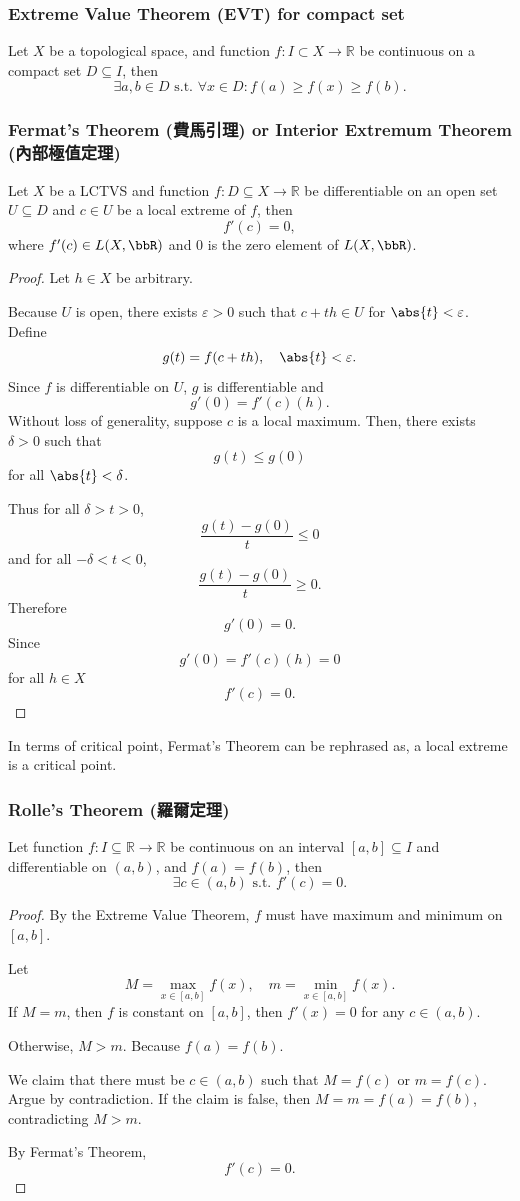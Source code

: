 \subsubsection{Extreme Value Theorem (EVT) for compact set}
Let $X$ be a topological space, and function $f\colon I\subset X\to\mathbb{R}$ be continuous on a compact set $D\subseteq I$, then
\[\exists a,b \in D \text{\ s.t.\ }\forall x \in D\colon f(a)\geq f(x)\geq f(b).\]
\subsubsection{Fermat's Theorem (費馬引理) or Interior Extremum Theorem (內部極值定理)}
Let $X$ be a LCTVS and function $f\colon D\subseteq X\to\mathbb{R}$ be differentiable on an open set $U\subseteq D$ and $c\in U$ be a local extreme of $f$, then
\[f'(c)=0,\]
where $f'(c)\in L(X,\bbR)$ and $0$ is the zero element of $L(X,\bbR)$.
\begin{proof}
Let $h\in X$ be arbitrary.

Because $U$ is open, there exists $\varepsilon>0$ such that $c+th\in U$ for $\abs{t}<\varepsilon$. Define
\[g(t)=f(c+th),\quad\abs{t}<\varepsilon.\]
Since $f$ is differentiable on $U$, $g$ is differentiable and
\[g'(0)=f'(c)(h).\]
Without loss of generality, suppose $c$ is a local maximum. Then, there exists $\delta>0$ such that
\[g(t)\leq g(0)\]
for all $\abs{t}<\delta$.

Thus for all $\delta>t>0$,
\[\frac{g(t)-g(0)}{t}\leq 0\]
and for all $-\delta<t<0$,
\[\frac{g(t)-g(0)}{t}\geq 0.\]
Therefore
\[g'(0)=0.\]
Since
\[g'(0)=f'(c)(h)=0\]
for all $h\in X$
\[f'(c)=0.\]
\end{proof}
In terms of critical point, Fermat's Theorem can be rephrased as, a local extreme is a critical point.
\subsubsection{Rolle's Theorem (羅爾定理)}
Let function $f\colon I\subseteq\mathbb{R}\to\mathbb{R}$ be continuous on an interval $[a, b]\subseteq I$ and differentiable on $(a,b)$, and $f(a)=f(b)$, then
\[\exists c\in (a, b)\text{\ s.t.\ }f'(c)=0.\]
\begin{proof}
By the Extreme Value Theorem, $f$ must have maximum and minimum on $[a,b]$.

Let
\[M=\max_{x\in [a,b]}f(x),\quad m=\min_{x\in [a,b]}f(x).\]
If $M=m$, then $f$ is constant on $[a,b]$, then $f'(x)=0$ for any $c\in (a,b)$.

Otherwise, $M>m$. Because $f(a)=f(b)$. 

We claim that there must be $c\in (a,b)$ such that $M=f(c)$ or $m=f(c)$. Argue by contradiction. If the claim is false, then $M=m=f(a)=f(b)$, contradicting $M>m$.

By Fermat's Theorem,
\[f'(c)=0.\]
\end{proof}
